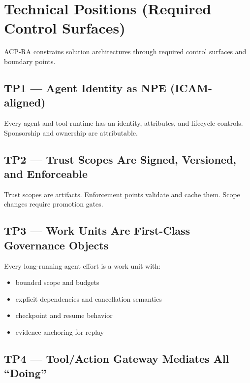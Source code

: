 \documentclass[11pt]{article}
\begin{document}
\hypertarget{technical-positions-required-control-surfaces}{%
\section{Technical Positions (Required Control Surfaces)}\label{technical-positions-required-control-surfaces}}

ACP‑RA constrains solution architectures through required control
surfaces and boundary points.

\hypertarget{tp1-agent-identity-as-npe-icam-aligned}{%
\subsection{TP1 --- Agent Identity as NPE (ICAM-aligned)}\label{tp1-agent-identity-as-npe-icam-aligned}}

Every agent and tool-runtime has an identity, attributes, and lifecycle
controls. Sponsorship and ownership are attributable.

\hypertarget{tp2-trust-scopes-are-signed-versioned-and-enforceable}{%
\subsection{TP2 --- Trust Scopes Are Signed, Versioned, and Enforceable}\label{tp2-trust-scopes-are-signed-versioned-and-enforceable}}

Trust scopes are artifacts. Enforcement points validate and cache them.
Scope changes require promotion gates.

\hypertarget{tp3-work-units-are-first-class-governance-objects}{%
\subsection{TP3 --- Work Units Are First-Class Governance Objects}\label{tp3-work-units-are-first-class-governance-objects}}

Every long-running agent effort is a work unit with:

\begin{itemize}
\tightlist
\item
  bounded scope and budgets
\item
  explicit dependencies and cancellation semantics
\item
  checkpoint and resume behavior
\item
  evidence anchoring for replay
\end{itemize}

\hypertarget{tp4-toolaction-gateway-mediates-all-doing}{%
\subsection{TP4 --- Tool/Action Gateway Mediates All ``Doing''}\label{tp4-toolaction-gateway-mediates-all-doing}}
\end{document}
